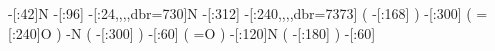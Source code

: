                     -[:42]N%
                     -[:96]%
      -[:24,,,,dbr={73}{0}]N%
                    -[:312]%
    -[:240,,,,dbr={73}{73}]%
                              (
                        -[:168]\phantom{N}%
                              )
                    -[:300]%
                              (
                        =[:240]O%
                              )
                          -N%
                              (
                        -[:300]%
                              )
                     -[:60]%
                              (
                              =O%
                              )
                    -[:120]N%
                              (
                        -[:180]%
                              )
                     -[:60]%